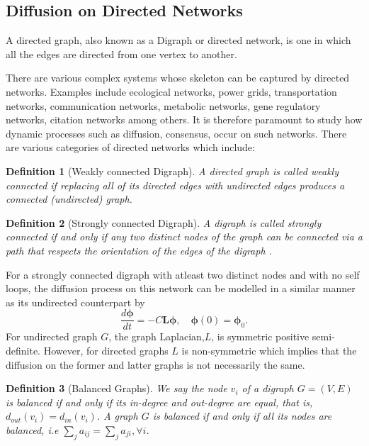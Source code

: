 \documentclass[10pt,a4paper]{article}
\newtheorem{defn}{Definition}
\begin{document}
     \newpage
     
        \subsection{Diffusion on Directed Networks}
        A directed graph, also known as a Digraph or directed network, is one in which all the edges are directed from one vertex to another. 
        
        There are various complex systems whose skeleton can be captured by directed networks. Examples include ecological  networks, power grids, transportation networks, communication networks, metabolic networks, gene regulatory networks, citation networks among others. It is therefore paramount to study how dynamic processes such as diffusion, consensus, occur on such networks. There are various categories of directed networks which include:
        \begin{defn}[Weakly connected Digraph]
        	A directed graph is called weakly connected if replacing all of its directed edges with undirected edges produces a connected (undirected) graph.
          \end{defn}   
        \begin{defn}[Strongly connected Digraph]
        	A digraph is called strongly connected if and only if any two distinct nodes of the graph can be connected via a path that respects the orientation of the edges of the digraph \citep{saber2003agreement}.
        \end{defn}        
        For a strongly connected digraph with atleast two distinct nodes and with no self loops, the diffusion process on this network can be modelled in a similar manner as its undirected counterpart by 
        \begin{equation}
        \frac{d\boldsymbol{\phi}}{dt} = -C\mathbf{L}\boldsymbol{\phi}, \quad \boldsymbol{\phi}(0) = \boldsymbol{\phi}_0.
        \end{equation}
        For undirected graph $G$, the graph Laplacian,$L$, is symmetric positive semi-definite. However, for directed graphs $L$ is non-symmetric which implies that the diffusion on the former and latter graphs is not necessarily the same.
        
         \begin{defn}[Balanced Graphs]
        	We say the node $v_i$ of a digraph $G=(V,E)$ is balanced if and only if its in-degree and out-degree are equal, that is, $d_{out}(v_i) =d_{in}(v_i)$. A graph $G$ is balanced if and only if all its nodes are balanced, i.e $\sum_j a_{ij} = \sum_j a_{ji}, \forall i$. 
        \end{defn}
        
\end{document}
